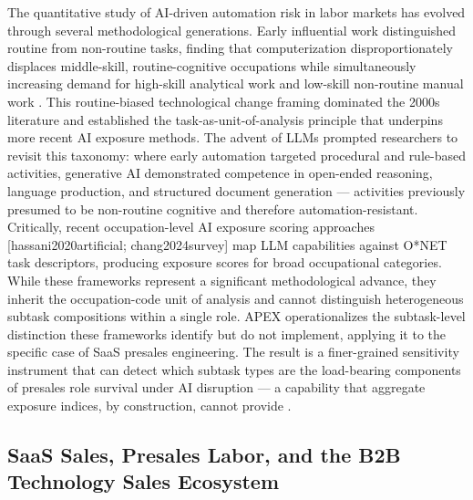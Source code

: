 \documentclass[10pt, conference]{IEEEtran}
\begin{document}
The quantitative study of AI-driven automation risk in labor markets has evolved through several methodological generations. Early influential work distinguished routine from non-routine tasks, finding that computerization disproportionately displaces middle-skill, routine-cognitive occupations while simultaneously increasing demand for high-skill analytical work and low-skill non-routine manual work \cite{santana2020future}. This routine-biased technological change framing dominated the 2000s literature and established the task-as-unit-of-analysis principle that underpins more recent AI exposure methods. The advent of LLMs prompted researchers to revisit this taxonomy: where early automation targeted procedural and rule-based activities, generative AI demonstrated competence in open-ended reasoning, language production, and structured document generation --- activities previously presumed to be non-routine cognitive and therefore automation-resistant. Critically, recent occupation-level AI exposure scoring approaches [hassani2020artificial; chang2024survey] map LLM capabilities against O*NET task descriptors, producing exposure scores for broad occupational categories. While these frameworks represent a significant methodological advance, they inherit the occupation-code unit of analysis and cannot distinguish heterogeneous subtask compositions within a single role. APEX operationalizes the subtask-level distinction these frameworks identify but do not implement, applying it to the specific case of SaaS presales engineering. The result is a finer-grained sensitivity instrument that can detect which subtask types are the load-bearing components of presales role survival under AI disruption --- a capability that aggregate exposure indices, by construction, cannot provide \cite{martinezplumed2020futures}.

\subsection{SaaS Sales, Presales Labor, and the B2B Technology Sales Ecosystem}

\label{sec:saas\_sales\_presales\_labor\_and\_the\_b2b\_te}
\end{document}
